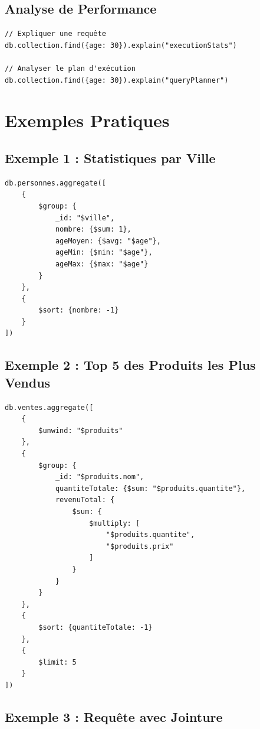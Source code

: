 \documentclass[11pt,a4paper]{article}
\begin{document}
\subsection{Analyse de Performance}

\begin{lstlisting}
// Expliquer une requête
db.collection.find({age: 30}).explain("executionStats")

// Analyser le plan d'exécution
db.collection.find({age: 30}).explain("queryPlanner")
\end{lstlisting}

\newpage

\section{Exemples Pratiques}

\subsection{Exemple 1 : Statistiques par Ville}

\begin{lstlisting}
db.personnes.aggregate([
    {
        $group: {
            _id: "$ville",
            nombre: {$sum: 1},
            ageMoyen: {$avg: "$age"},
            ageMin: {$min: "$age"},
            ageMax: {$max: "$age"}
        }
    },
    {
        $sort: {nombre: -1}
    }
])
\end{lstlisting}

\subsection{Exemple 2 : Top 5 des Produits les Plus Vendus}

\begin{lstlisting}
db.ventes.aggregate([
    {
        $unwind: "$produits"
    },
    {
        $group: {
            _id: "$produits.nom",
            quantiteTotale: {$sum: "$produits.quantite"},
            revenuTotal: {
                $sum: {
                    $multiply: [
                        "$produits.quantite",
                        "$produits.prix"
                    ]
                }
            }
        }
    },
    {
        $sort: {quantiteTotale: -1}
    },
    {
        $limit: 5
    }
])
\end{lstlisting}

\subsection{Exemple 3 : Requête avec Jointure}
\end{document}
